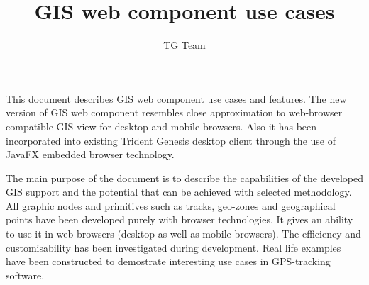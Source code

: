 \begin{titlepage}
\title{GIS web component use cases}
\author{TG Team}
\maketitle
\clearpage
\tableofcontents
\clearpage

This document describes GIS web component use cases and features. The new version of GIS web component resembles close approximation to web-browser compatible GIS view for desktop and mobile browsers. Also it has been incorporated into existing Trident Genesis desktop client through the use of JavaFX embedded browser technology.

The main purpose of the document is to describe the capabilities of the developed GIS support and the potential that can be achieved with selected methodology. All graphic nodes and primitives such as tracks, geo-zones and geographical points have been developed purely with browser technologies. It gives an ability to use it in web browsers (desktop as well as mobile browsers). The efficiency and customisability has been investigated during development. Real life examples have been constructed to demostrate interesting use cases in GPS-tracking software.

\end{titlepage}